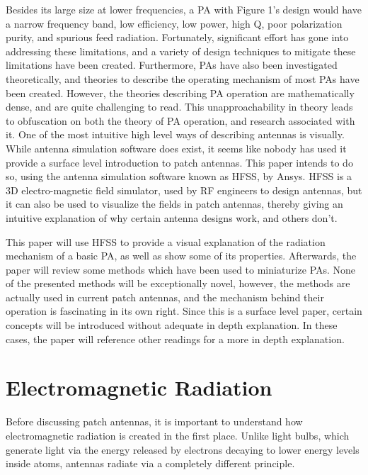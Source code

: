 \documentclass[12pt]{article}
\begin{document}
Besides its large size at lower frequencies, a PA with Figure 1's design would have a narrow frequency band, low efficiency, low power, high Q, poor polarization purity, and spurious feed radiation\cite{balanis2016antenna}. Fortunately, significant effort has gone into addressing these limitations, and a variety of design techniques to mitigate these limitations have been created\cite{balanis2016antenna}. Furthermore, PAs have also been investigated theoretically, and theories to describe the operating mechanism of most PAs have been created. However, the theories describing PA operation are mathematically dense, and are quite challenging to read. This unapproachability in theory leads to obfuscation on both the theory of PA operation, and research associated with it. One of the most intuitive high level ways of describing antennas is visually. While antenna simulation software does exist, it seems like nobody has used it provide a surface level introduction to patch antennas. This paper intends to do so, using the antenna simulation software known as HFSS, by Ansys. HFSS is a 3D electro-magnetic field simulator, used by RF engineers to design antennas, but it can also be used to visualize the fields in patch antennas, thereby giving an intuitive explanation of why certain antenna designs work, and others don't.

This paper will use HFSS to provide a visual explanation of the radiation mechanism of a basic PA, as well as show some of its properties. Afterwards, the paper will review some methods which have been used to miniaturize PAs. None of the presented methods will be exceptionally novel, however, the methods are actually used in current patch antennas, and the mechanism behind their operation is fascinating in its own right. Since this is a surface level paper, certain concepts will be introduced without adequate in depth explanation. In these cases, the paper will reference other readings for a more in depth explanation.            
  
\section{Electromagnetic Radiation}  

Before discussing patch antennas, it is important to understand how electromagnetic radiation is created in the first place. Unlike light bulbs, which generate light via the energy released by electrons decaying to lower energy levels inside atoms, antennas radiate via a completely different principle.
\end{document}
